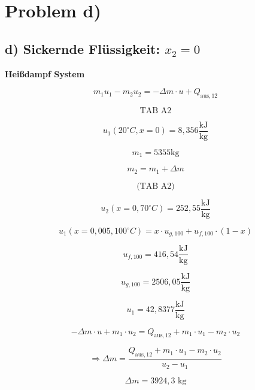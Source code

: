 \section*{Problem d)}

\subsection*{d) Sickernde Flüssigkeit: $x_2 = 0$}

\textbf{Heißdampf System}

\[
m_1 u_1 - m_2 u_2 = -\Delta m \cdot u + Q_{\text{aus},12}
\]

\[
\text{TAB A2}
\]

\[
u_1 (20^\circ C, x = 0) = 8,356 \frac{\text{kJ}}{\text{kg}}
\]

\[
m_1 = 5355 \text{kg}
\]

\[
m_2 = m_1 + \Delta m
\]

\[
\text{(TAB A2)}
\]

\[
u_2 (x = 0, 70^\circ C) = 252,55 \frac{\text{kJ}}{\text{kg}}
\]

\[
u_1 (x = 0,005, 100^\circ C) = x \cdot u_{g,100} + u_{f,100} \cdot (1-x)
\]

\[
u_{f,100} = 416,54 \frac{\text{kJ}}{\text{kg}}
\]

\[
u_{g,100} = 2506,05 \frac{\text{kJ}}{\text{kg}}
\]

\[
u_1 = 42,8377 \frac{\text{kJ}}{\text{kg}}
\]

\[
-\Delta m \cdot u + m_1 \cdot u_2 = Q_{\text{aus},12} + m_1 \cdot u_1 - m_2 \cdot u_2
\]

\[
\Rightarrow \Delta m = \frac{Q_{\text{aus},12} + m_1 \cdot u_1 - m_2 \cdot u_2}{u_2 - u_1}
\]

\[
\Delta m = 3924,3 \text{ kg}
\]
